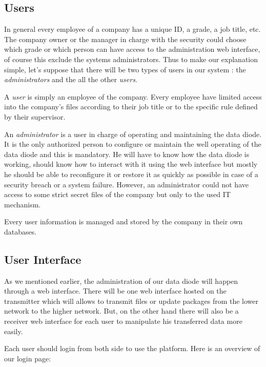 \documentclass[a4paper,10pt]{article}
\begin{document}
\subsection{Users} 
In general every employee of a company has a unique ID, a grade, a job title, etc. The company owner or the manager in charge with the security could choose which grade or which person can have access to the administration web interface, of course this exclude the systems administrators.  Thus to make our explanation simple, let's suppose that there will be two types of users in our system : the \textit{administrators} and the all the other \textit{users}.

A \textit{user} is simply an employee of the company. Every employee have limited access into the company's files according to their job title or to the specific rule defined by their supervisor.

An \textit{administrator} is a user in charge of operating and maintaining the data diode. It is the only authorized person to configure or maintain the well operating of the data diode and this is mandatory. He will have to know how the data diode is working, should know how to interact with it using the web interface but mostly he should be able to reconfigure it or restore it as quickly as possible in case of a security breach or a system failure. However, an administrator could not have access to some strict secret files of the company but only to the used IT mechanism.

Every user information is managed and stored by the company in their own databases.

\subsection{User Interface}

As we mentioned earlier, the administration of our data diode will happen through a web interface. There will be one web interface hosted on the transmitter which will allows to transmit files or update packages from the lower network to the higher network. But, on the other hand there will also be a receiver web interface for each user to manipulate his transferred data more easily.

Each user should login from both side to use the platform. Here is an overview of our login page:
\end{document}
